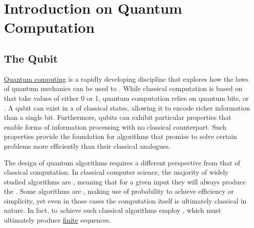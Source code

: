 \documentclass[a4paper, 12pt]{report}
\institute{\curlyquotes{\hspace{0.25mm}Sapienza} Università di Roma}
\subtitle{Appunti integrati con il libro \book}
\author{\textit{Autore}\\\authorName}
\institute{\curlyquotes{\hspace{0.25mm}Sapienza} University of Rome}
\subtitle{Lecture notes integrated with the book \book}
\author{\textit{Author}\\\authorName}
\title{\courseName}
\date{\today}
\begin{document}
\maketitle

{
	\hypersetup{allcolors=black}

	\romantableofcontents
}

\introduction


\chapter{Introduction on Quantum Computation}

\section{The Qubit}

\href{https://en.wikipedia.org/wiki/Quantum_computing}{Quantum computing} is a rapidly developing discipline that explores how the laws of quantum mechanics can be used to . While classical computation is based on  that take values of either 0 or 1, quantum computation relies on quantum bits, or . A qubit can exist in a  of classical states, allowing it to encode richer information than a single bit. Furthermore, qubits can exhibit particular properties that enable forms of information processing with no classical counterpart. Such properties provide the foundation for algorithms that promise to solve certain problems more efficiently than their classical analogues.

The design of quantum algorithms requires a different perspective from that of classical computation. In classical computer science, the majority of widely studied algorithms are , meaning that for a given input they will always produce the . Some algorithms are , making use of probability to achieve efficiency or simplicity, yet even in those cases the computation itself is ultimately classical in nature. In fact, to achieve such  classical algorithms employ , which must ultimately produce \underline{finite} sequences.
\end{document}
